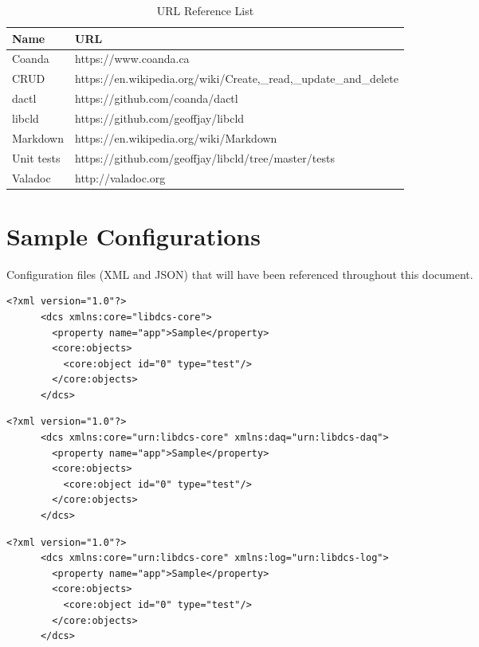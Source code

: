 \documentclass[11pt]{article}
\begin{document}
    \begin{table}[H]
      \centering
      \begin{tabular}{l p{10cm}}
        \toprule
        Name & URL \\ [0.5ex]
        \midrule
        Coanda     & https://www.coanda.ca \\
        CRUD       & https://en.wikipedia.org/wiki/Create,\_read,\_update\_and\_delete \\
        dactl      & https://github.com/coanda/dactl \\
        libcld     & https://github.com/geoffjay/libcld \\
        Markdown   & https://en.wikipedia.org/wiki/Markdown \\
        Unit tests & https://github.com/geoffjay/libcld/tree/master/tests \\
        Valadoc    & http://valadoc.org \\
        \bottomrule
      \end{tabular}
      \caption{URL Reference List}\label{tab:websites}
    \end{table}

  \newpage

  \section{Sample Configurations}\label{app:configurations}

    Configuration files (XML and JSON) that will have been referenced throughout
    this document.

    \begin{lstlisting}[caption={Complete Core Sample},label={lst:full-core}]
      <?xml version="1.0"?>
      <dcs xmlns:core="libdcs-core">
        <property name="app">Sample</property>
        <core:objects>
          <core:object id="0" type="test"/>
        </core:objects>
      </dcs>
    \end{lstlisting}

    \begin{lstlisting}[caption={Complete DAQ Sample},label={lst:full-daq}]
      <?xml version="1.0"?>
      <dcs xmlns:core="urn:libdcs-core" xmlns:daq="urn:libdcs-daq">
        <property name="app">Sample</property>
        <core:objects>
          <core:object id="0" type="test"/>
        </core:objects>
      </dcs>
    \end{lstlisting}

    \begin{lstlisting}[caption={Complete Log Sample},label={lst:full-log}]
      <?xml version="1.0"?>
      <dcs xmlns:core="urn:libdcs-core" xmlns:log="urn:libdcs-log">
        <property name="app">Sample</property>
        <core:objects>
          <core:object id="0" type="test"/>
        </core:objects>
      </dcs>
    \end{lstlisting}
\end{document}
